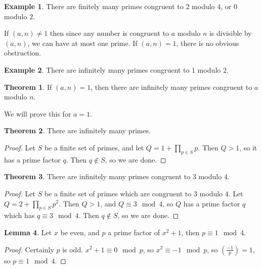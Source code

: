 \documentclass{article}
\newcommand{\rb}[1]{\left( #1 \right)}
\newcommand{\legendre}[2]{\rb{\tfrac{#1}{#2}}}
\theoremstyle{definition}\newtheorem{definition}{Definition}
\theoremstyle{definition}\newtheorem{remark}[definition]{Remark}
\theoremstyle{definition}\newtheorem*{example}{Example}
\theoremstyle{definition}\newtheorem*{note}{Note}
\newtheorem{lemma}[definition]{Lemma}
\newtheorem{theorem}[definition]{Theorem}
\begin{document}
\begin{example}
There are finitely many primes congruent to $ 2 $ modulo $ 4 $, or $ 0 $ modulo $ 2 $.
\end{example}

If $ \rb{a, n} \ne 1 $ then since any number is congruent to $ a $ modulo $ n $ is divisible by $ \rb{a, n} $, we can have at most one prime. If $ \rb{a, n} = 1 $, there is no obvious obstruction.

\begin{example}
There are infinitely many primes congruent to $ 1 $ modulo $ 2 $.
\end{example}

\begin{theorem}
If $ \rb{a, n} = 1 $, then there are infinitely many primes congruent to $ a $ modulo $ n $.
\end{theorem}

We will prove this for $ a = 1 $.

\begin{theorem}
There are infinitely many primes.
\end{theorem}

\begin{proof}
Let $ S $ be a finite set of primes, and let $ Q = 1 + \prod_{p \in S} p $. Then $ Q > 1 $, so it has a prime factor $ q $. Then $ q \notin S $, so we are done.
\end{proof}

\begin{theorem}
There are infinitely many primes congruent to $ 3 $ modulo $ 4 $.
\end{theorem}

\begin{proof}
Let $ S $ be a finite set of primes which are congruent to $ 3 $ modulo $ 4 $. Let $ Q = 2 + \prod_{p \in S} p^2 $. Then $ Q > 1 $, and $ Q \equiv 3 \mod 4 $, so $ Q $ has a prime factor $ q $ which has $ q \equiv 3 \mod 4 $. Then $ q \notin S $, so we are done.
\end{proof}

\begin{lemma}
\label{lem:87}
Let $ x $ be even, and $ p $ a prime factor of $ x^2 + 1 $, then $ p \equiv 1 \mod 4 $.
\end{lemma}

\begin{proof}
Certainly $ p $ is odd. $ x^2 + 1 \equiv 0 \mod p $, so $ x^2 \equiv -1 \mod p $, so $ \legendre{-1}{p} = 1 $, so $ p \equiv 1 \mod 4 $.
\end{proof}
\end{document}

